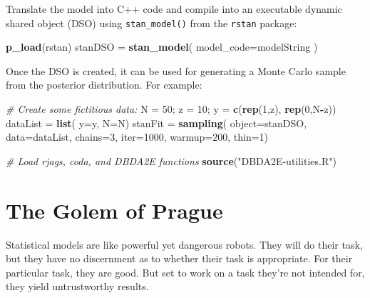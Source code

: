 \documentclass[
]{book}
\newenvironment{Shaded}{\begin{snugshade}}{\end{snugshade}}
\newcommand{\CommentTok}[1]{\textcolor[rgb]{0.56,0.35,0.01}{\textit{#1}}}
\newcommand{\DataTypeTok}[1]{\textcolor[rgb]{0.13,0.29,0.53}{#1}}
\newcommand{\DecValTok}[1]{\textcolor[rgb]{0.00,0.00,0.81}{#1}}
\newcommand{\KeywordTok}[1]{\textcolor[rgb]{0.13,0.29,0.53}{\textbf{#1}}}
\newcommand{\NormalTok}[1]{#1}
\newcommand{\OperatorTok}[1]{\textcolor[rgb]{0.81,0.36,0.00}{\textbf{#1}}}
\newcommand{\StringTok}[1]{\textcolor[rgb]{0.31,0.60,0.02}{#1}}
\begin{document}
Translate the model into C++ code and compile into an executable dynamic shared object (DSO) using \texttt{stan\_model()} from the \texttt{rstan} package:

\begin{Shaded}
\begin{Highlighting}[]
\KeywordTok{p_load}\NormalTok{(rstan)}
\NormalTok{stanDSO =}\StringTok{ }\KeywordTok{stan_model}\NormalTok{( }\DataTypeTok{model_code=}\NormalTok{modelString )}
\end{Highlighting}
\end{Shaded}

Once the DSO is created, it can be used for generating a Monte Carlo sample from the posterior distribution. For example:

\begin{Shaded}
\begin{Highlighting}[]
\CommentTok{# Create some fictitious data:}
\NormalTok{N =}\StringTok{ }\DecValTok{50}\NormalTok{; z =}\StringTok{ }\DecValTok{10}\NormalTok{; y =}\StringTok{ }\KeywordTok{c}\NormalTok{(}\KeywordTok{rep}\NormalTok{(}\DecValTok{1}\NormalTok{,z), }\KeywordTok{rep}\NormalTok{(}\DecValTok{0}\NormalTok{,N}\OperatorTok{-}\NormalTok{z))}
\NormalTok{dataList =}\StringTok{ }\KeywordTok{list}\NormalTok{( }\DataTypeTok{y=}\NormalTok{y, }\DataTypeTok{N=}\NormalTok{N)}
\NormalTok{stanFit =}\StringTok{ }\KeywordTok{sampling}\NormalTok{( }\DataTypeTok{object=}\NormalTok{stanDSO, }\DataTypeTok{data=}\NormalTok{dataList,}
                    \DataTypeTok{chains=}\DecValTok{3}\NormalTok{, }\DataTypeTok{iter=}\DecValTok{1000}\NormalTok{, }\DataTypeTok{warmup=}\DecValTok{200}\NormalTok{, }\DataTypeTok{thin=}\DecValTok{1}\NormalTok{)}

\CommentTok{# Load rjags, coda, and DBDA2E functions}
\KeywordTok{source}\NormalTok{(}\StringTok{"DBDA2E-utilities.R"}\NormalTok{)}
\end{Highlighting}
\end{Shaded}

\hypertarget{theGolemOfPrague}{%
\chapter{The Golem of Prague}\label{theGolemOfPrague}}

Statistical models are like powerful yet dangerous robots. They will do their task, but they have no discernment as to whether their task is appropriate. For their particular task, they are good. But set to work on a task they're not intended for, they yield untrustworthy results.
\end{document}
